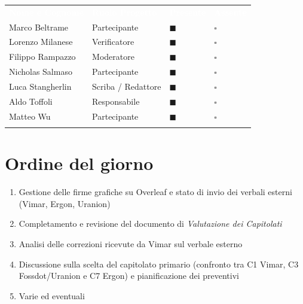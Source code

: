 \documentclass[12pt,a4paper]{article}
\newcommand{\tightlist}{\setlength{\itemsep}{1pt}\setlength{\parskip}{0pt}}
\begin{document}
\begin{center}
\begin{tabularx}{\linewidth}{>{\raggedright\arraybackslash}X>{\centering\arraybackslash}X>{\centering\arraybackslash}p{2.2cm}>{\centering\arraybackslash}p{2.2cm}}
\rowcolor{bfblue}\textcolor{white}{\textbf{Nome e Cognome}} & \textcolor{white}{\textbf{Ruolo Progetto}} & \textcolor{white}{\textbf{Presente}} & \textcolor{white}{\textbf{Assente}} \\
Marco Beltrame & Partecipante & $\blacksquare$ & $\square$ \\ \arrayrulecolor{bfline}\hline
Lorenzo Milanese & Verificatore & $\blacksquare$ & $\square$ \\ \arrayrulecolor{bfline}\hline
Filippo Rampazzo & Moderatore & $\blacksquare$ & $\square$ \\ \arrayrulecolor{bfline}\hline
Nicholas Salmaso & Partecipante & $\blacksquare$ & $\square$ \\ \arrayrulecolor{bfline}\hline
Luca Stangherlin & Scriba / Redattore& $\blacksquare$ & $\square$ \\ \arrayrulecolor{bfline}\hline
Aldo Toffoli & Responsabile & $\blacksquare$ & $\square$ \\ \arrayrulecolor{bfline}\hline
Matteo Wu & Partecipante & $\blacksquare$ & $\square$ \\ \arrayrulecolor{bfline}\hline
\end{tabularx}
\end{center}



\hypertarget{ordine-del-giorno}{%
\section{Ordine del giorno}}

\begin{enumerate}
\tightlist
\item Gestione delle firme grafiche su Overleaf e stato di invio dei verbali esterni (Vimar, Ergon, Uranion)
\item Completamento e revisione del documento di \emph{Valutazione dei Capitolati}
\item Analisi delle correzioni ricevute da Vimar sul verbale esterno
\item Discussione sulla scelta del capitolato primario (confronto tra C1 Vimar, C3 Fossdot/Uranion e C7 Ergon) e pianificazione dei preventivi
\item Varie ed eventuali
\end{enumerate}
\end{document}
